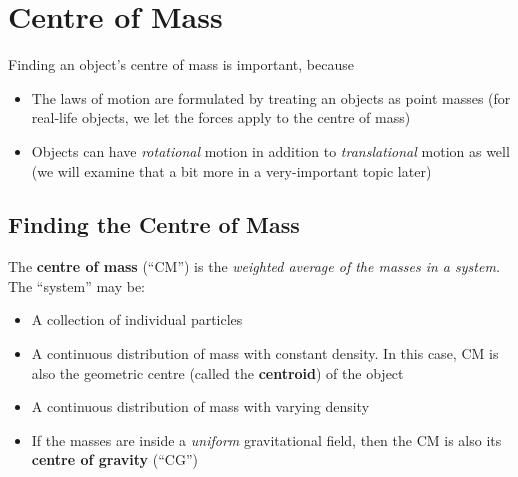 \chapter{Centre of Mass}
\label{chapter:cm}


Finding an object's centre of mass is important, because
\begin{itemize}
\item The laws of motion are formulated by treating an objects as point
  masses (for real-life objects, we let the forces apply to the centre of
  mass)
\item Objects can have \emph{rotational} motion in addition to
  \emph{translational} motion as well (we will examine that a bit more in a
  very-important topic later)
\end{itemize}


\section{Finding the Centre of Mass}

The \textbf{centre of mass} (``CM'') is the \emph{weighted average of the
masses in a system.} The ``system'' may be:
\begin{itemize}
\item A collection of individual particles
\item A continuous distribution of mass with constant density. In this case,
  CM is also the geometric centre (called the \textbf{centroid}) of the object
\item A continuous distribution of mass with varying density
\item If the masses are inside a \emph{uniform} gravitational field, then the
  CM is also its \textbf{centre of gravity} (``CG'')
\end{itemize}

